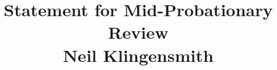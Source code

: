\documentclass[10pt,onecolumn]{article}
\title{Statement for Mid-Probationary Review \\
Neil Klingensmith}
\date{}
\begin{document}
\maketitle

\end{document}
